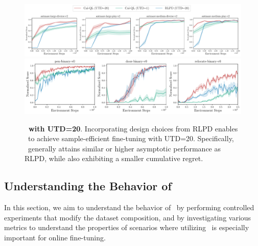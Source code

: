 \fi

\begin{figure}[h]
\begin{center}    
{\includegraphics[clip,width=1\linewidth]{chapters/cal_ql/figs-sample/antmaze-utd20-rlpd-final.pdf}} {\includegraphics[clip,width=0.75\linewidth]{chapters/cal_ql/figs-sample/adroit-rlpd-final.pdf}}
\end{center}
\vspace{-0.3cm}
\caption{\label{fig:rlpd} \footnotesize{\textbf{\methodname\ with UTD=20}. Incorporating design choices from RLPD enables \methodname\ to achieve sample-efficient fine-tuning with UTD=20. Specifically, \methodname\ generally attains similar or higher asymptotic performance as RLPD, while also exhibiting a smaller cumulative regret.}}
\vspace{-0.6cm}
\end{figure}





\vspace{-0.2cm}
\subsection{Understanding the Behavior of \methodname}
\label{subsec:diagonistic}
\vspace{-0.2cm}

In this section, we aim to understand the behavior of \methodname\ by performing controlled experiments that modify the dataset composition, and by investigating various metrics to understand the properties of scenarios where utilizing \methodname\ is especially important for online fine-tuning.         

